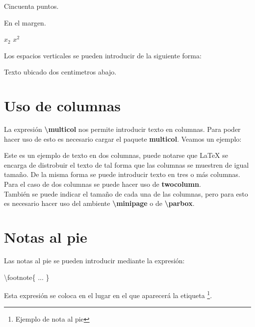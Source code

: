 \documentclass[letterpaper,11pt]{article}
\begin{document}
\hspace{50pt}Cincuenta puntos.

\hspace{-3cm}En el margen.

$x_{2}$ \hspace{4cm} $x^{2}$

Los espacios verticales se pueden introducir de la siguiente forma:

\vspace{2cm}Texto ubicado dos centimetros abajo.



\section{Uso de columnas}

La expresión \textbf{\textbackslash multicol} nos permite introducir texto en columnas. Para poder hacer uso de esto es necesario cargar el paquete \textbf{multicol}. Veamos un ejemplo:

\begin{multicols}{2}
Este es  un ejemplo de texto en dos columnas, puede notarse que \LaTeX{} se encarga de distrobuir el texto de tal forma que las columnas se muestren de igual tamaño. De la misma forma se puede introducir texto en tres o más columnas.\\
Para el caso de dos columnas se puede hacer uso de \textbf{twocolumn}.\\
También se puede indicar el tamaño de cada una de las columnas, pero para esto es necesario hacer uso del ambiente \textbf{\textbackslash minipage} 
o de \textbf{\textbackslash parbox}.
\end{multicols}

\pagebreak

\section{Notas al pie}

Las notas al pie se pueden introducir mediante la expresión:
\begin{center}
\textbackslash footnote\{ ... \}
\end{center}
Esta expresión se coloca en el lugar en el que aparecerá la etiqueta \footnote{Ejemplo de nota al pie}.
\end{document}
